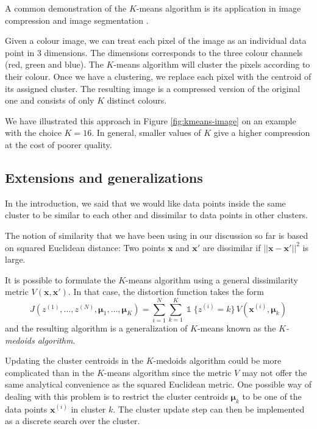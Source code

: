 \documentclass[final,3p,times,twocolumn]{elsarticle}
\let\bs\boldsymbol
\DeclareMathOperator*{\id}{\mathds{1}}
\begin{document}
A common demonstration of the $K$-means algorithm is its application in image compression and image segmentation \cite{forsyth2002}.

Given a colour image, we can treat each pixel of the image as an individual data point in 3 dimensions.
The dimensions corresponds to the three colour channels (red, green and blue).
The $K$-means algorithm will cluster the pixels according to their colour.
Once we have a clustering, we replace each pixel with the centroid of its assigned cluster.
The resulting image is a compressed version of the original one and consists of only $K$ distinct colours.

We have illustrated this approach in Figure \ref{fig:kmeans-image} on an example with the choice $K=16$.
In general, smaller values of $K$ give a higher compression at the cost of poorer quality.

\subsection{Extensions and generalizations}
\label{sect:kmeans-concl}
In the introduction, we said that we would like data points inside the same cluster to be similar to each other and dissimilar to data points in other clusters.

The notion of similarity that we have been using in our discussion so far is based on squared Euclidean distance:
Two points $\bs x$ and $\bs x'$ are dissimilar if $||\bs x-\bs x'||^2$ is large.

It is possible to formulate the $K$-means algorithm using a general dissimilarity metric $V(\boldsymbol x, \boldsymbol x')$.
In that case, the distortion function takes the form
\begin{equation*}
J(z^{(1)},\dots,z^{(N)},\bs \mu_1,\dots,\bs \mu_K) = \sum_{i=1}^N \sum_{k=1}^K \id\{z^{(i)}=k\}\,V(\bs x^{(i)}, \bs \mu_k)
\end{equation*}
and the resulting algorithm is a generalization of $K$-means known as the \emph{$K$-medoids algorithm}.

Updating the cluster centroids in the $K$-medoids algorithm could be more complicated than in the $K$-means algorithm since the metric $V$ may not offer the same analytical convenience as the squared Euclidean metric.
One possible way of dealing with this problem is to restrict the cluster centroids $\bs\mu_k$ to be one of the data points $\bs x^{(i)}$ in cluster $k$.
The cluster update step can then be implemented as a discrete search over the cluster.
\end{document}
